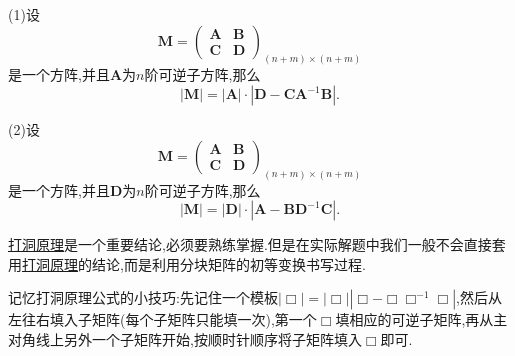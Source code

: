 \documentclass[lang=cn,newtx,10pt,scheme=chinese]{elegantbook}
\begin{document}
\begin{proposition}[打洞原理]\label{proposition:打洞原理}
    (1)设
    \[
    \boldsymbol{M} = 
    \begin{pmatrix}
    \boldsymbol{A} & \boldsymbol{B} \\
    \boldsymbol{C} & \boldsymbol{D}
    \end{pmatrix}_{(n + m) \times (n + m)}
    \]
    是一个方阵,并且\(\boldsymbol{A}\)为\(n\)阶可逆子方阵,那么
    \[
    |\boldsymbol{M}| = |\boldsymbol{A}| \cdot |\boldsymbol{D} - \boldsymbol{C}\boldsymbol{A}^{-1}\boldsymbol{B}|.
    \]

    (2)设
    \[
    \boldsymbol{M} = 
    \begin{pmatrix}
    \boldsymbol{A} & \boldsymbol{B} \\
    \boldsymbol{C} & \boldsymbol{D}
    \end{pmatrix}_{(n + m) \times (n + m)}
    \]
    是一个方阵,并且\(\boldsymbol{D}\)为\(n\)阶可逆子方阵,那么
    \[
    |\boldsymbol{M}| = |\boldsymbol{D}| \cdot |\boldsymbol{A} - \boldsymbol{B}\boldsymbol{D}^{-1}\boldsymbol{C}|.
    \]
\end{proposition}
\begin{note}
    \hyperref[proposition:打洞原理]{打洞原理}是一个重要结论,必须要熟练掌握.但是在实际解题中我们一般不会直接套用\hyperref[proposition:打洞原理]{打洞原理}的结论,而是利用分块矩阵的初等变换书写过程.

    记忆打洞原理公式的小技巧:先记住一个模板$\left| \Box \right|=\left| \Box \right|\left| \Box -\Box \Box ^{-1}\Box \right|$,然后从左往右填入子矩阵(每个子矩阵只能填一次),第一个$\Box$填相应的可逆子矩阵,再从主对角线上另外一个子矩阵开始,按顺时针顺序将子矩阵填入$\Box$即可.
\end{note}
\end{document}
